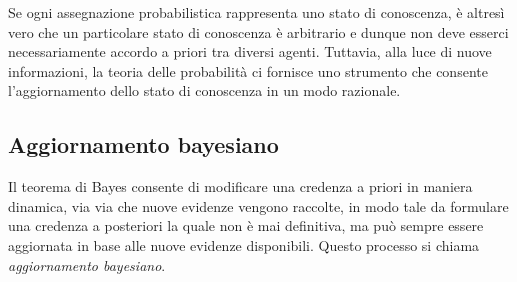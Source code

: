 \documentclass[
  11pt,
]{krantz}
\theoremstyle{definition}
\theoremstyle{definition}
\theoremstyle{definition}
\theoremstyle{definition}
\theoremstyle{remark}
\begin{document}
Se ogni assegnazione probabilistica rappresenta uno stato di conoscenza, è altresì vero che un particolare stato di conoscenza è arbitrario e dunque non deve esserci necessariamente accordo a priori tra diversi agenti. Tuttavia, alla luce di nuove informazioni, la teoria delle probabilità ci fornisce uno strumento che consente l'aggiornamento dello stato di conoscenza in un modo razionale.

\hypertarget{aggiornamento-bayesiano}{%
\subsection{Aggiornamento bayesiano}\label{aggiornamento-bayesiano}}

Il teorema di Bayes consente di modificare una credenza a priori in maniera dinamica, via via che nuove evidenze vengono raccolte, in modo tale da formulare una credenza a posteriori la quale non è mai definitiva, ma può sempre essere aggiornata in base alle nuove evidenze disponibili. Questo processo si chiama \emph{aggiornamento bayesiano}.
\end{document}

